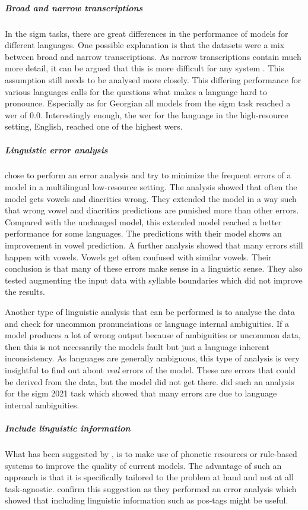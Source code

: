 \subparagraph{Broad and narrow transcriptions}
In the \ac{sigm} tasks, there are great differences in the performance of models for different languages. One possible explanation is that the datasets were a mix between broad and narrow transcriptions. As narrow transcriptions contain much more detail, it can be argued that this is more difficult for any system \citep{Ashby-Bartley.2021}. This assumption still needs to be analysed more closely. This differing performance for various languages calls for the questions what makes a language hard to pronounce. Especially as for Georgian all models from the \ac{sigm} task reached a \ac{wer} of $0.0$. Interestingly enough, the \ac{wer} for the language in the high-resource setting, English, reached one of the highest \acp{wer}.

\subparagraph{Linguistic error analysis} \citet{lo-nicolai-2021-linguistic} chose to perform an error analysis and try to minimize the frequent errors of a model in a multilingual low-resource setting. The analysis showed that often the model gets vowels and diacritics wrong. They extended the model in a way such that wrong vowel and diacritics predictions are punished more than other errors. Compared with the unchanged model, this extended model reached a better performance for some languages. The predictions with their model shows an improvement in vowel prediction. A further analysis showed that many errors still happen with vowels. Vowels get often confused with similar vowels. Their conclusion is that many of these errors make sense in a linguistic sense. They also tested augmenting the input data with syllable boundaries which did not improve the results. 

Another type of linguistic analysis that can be performed is to analyse the data and check for uncommon pronunciations or language internal ambiguities. If a model produces a lot of wrong output because of ambiguities or uncommon data, then this is not necessarily the models fault but just a language inherent inconsistency. As languages are generally ambiguous, this type of analysis is very insightful to find out about \textit{real} errors of the model. These are errors that could be derived from the data, but the model did not get there. \cite{Ashby-Bartley.2021} did such an analysis for the \ac{sigm} 2021 task which showed that many errors are due to language internal ambiguities.


\subparagraph{Include linguistic information} What has been suggested by \cite{gorman-etal-2020-sigmorphon}, is to make use of phonetic resources or rule-based systems to improve the quality of current models. The advantage of such an approach is that it is specifically tailored to the problem at hand and not at all task-agnostic. \cite{makarov-clematide-2020-cluzh} confirm this suggestion as they performed an error analysis which showed that including linguistic information such as \ac{pos}-tags might be useful. 

